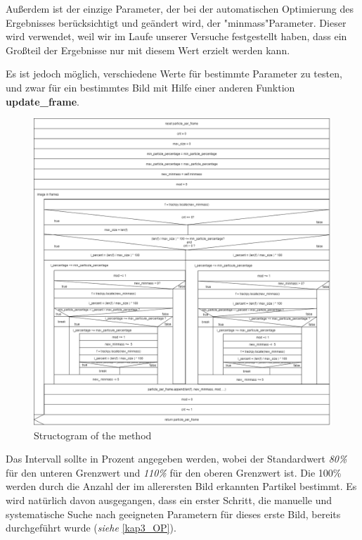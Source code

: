 Außerdem ist der einzige Parameter, der bei der automatischen Optimierung des Ergebnisses berücksichtigt und geändert wird, der "minmass"\-Parameter. Dieser wird verwendet, weil wir im Laufe unserer Versuche festgestellt haben, dass ein Großteil der Ergebnisse nur mit diesem Wert erzielt werden kann.

Es ist jedoch möglich, verschiedene Werte für bestimmte Parameter zu testen, und zwar für ein bestimmtes Bild mit Hilfe einer anderen Funktion \textbf{update\_frame}.

\begin{figure}[H]
  \centering
  \includegraphics[width=1\textwidth]{Grafiken/pts/structogram.png}
  \caption{Structogram of the method}
\end{figure}

Das Intervall sollte in Prozent angegeben werden, wobei der Standardwert \textit{80\%} für den unteren Grenzwert und \textit{110\%} für den oberen Grenzwert ist. Die 100\% werden durch die Anzahl der im allerersten Bild erkannten Partikel bestimmt. 
Es wird natürlich davon ausgegangen, dass ein erster Schritt, die manuelle und systematische Suche nach geeigneten Parametern für dieses erste Bild, bereits durchgeführt wurde (\textit{siehe} \ref{kap3_OP}).

